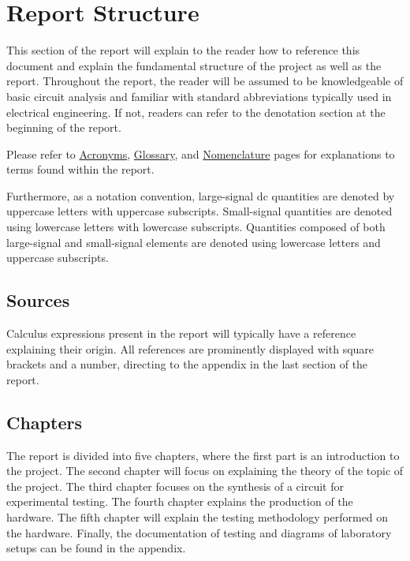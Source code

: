 \chapter*{Report Structure} \label{cha:report_structure}
This section of the report will explain to the reader how to reference this document and explain the fundamental structure of the project as well as the report. Throughout the report, the reader will be assumed to be knowledgeable of basic circuit analysis and familiar with standard abbreviations typically used in electrical engineering. If not, readers can refer to the denotation section at the beginning of the report.

Please refer to \hyperref[cha:acronyms]{Acronyms}, \hyperref[cha:glossary]{Glossary}, and \hyperref[cha:nomenclature]{Nomenclature} pages for explanations to terms found within the report.

Furthermore, as a notation convention, large-signal \gls{dc} quantities are denoted by uppercase letters with uppercase subscripts. Small-signal quantities are denoted using lowercase letters with lowercase subscripts. Quantities composed of both large-signal and small-signal elements are denoted using lowercase letters and uppercase subscripts.

\section*{Sources}
Calculus expressions present in the report will typically have a reference explaining their origin. All references are prominently displayed with square brackets and a number, directing to the appendix in the last section of the report.

\section*{Chapters}
The report is divided into five chapters, where the first part is an introduction to the project. The second chapter will focus on explaining the theory of the topic of the project. The third chapter focuses on the synthesis of a circuit for experimental testing. The fourth chapter explains the production of the hardware. The fifth chapter will explain the testing methodology performed on the hardware. Finally, the documentation of testing and diagrams of laboratory setups can be found in the appendix.

\cleardoublepage

